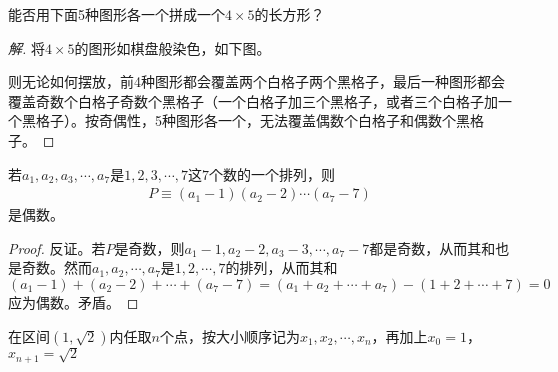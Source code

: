 \begin{example}
  能否用下面5种图形各一个拼成一个$4\times5$的长方形？

  \centering
\end{example}
\begin{proof}[解]
  将$4\times5$的图形如棋盘般染色，如下图。
  \begin{center}
  \end{center}
  则无论如何摆放，前4种图形都会覆盖两个白格子两个黑格子，最后一种图形都会覆盖奇数个白格子奇数个黑格子（一个白格子加三个黑格子，或者三个白格子加一个黑格子）。按奇偶性，5种图形各一个，无法覆盖偶数个白格子和偶数个黑格子。
\end{proof}

\begin{example}
  若$a_1,a_2,a_3,\cdots,a_7$是$1,2,3,\cdots,7$这$7$个数的一个排列，则
  \begin{align*}
    P\equiv (a_1 - 1)(a_2-2)\cdots(a_7-7)
  \end{align*}
  是偶数。
\end{example}
\begin{proof}
  反证。若$P$是奇数，则$a_1-1, a_2-2, a_3-3,\cdots, a_7-7$都是奇数，从而其和也是奇数。然而$a_1,a_2,\cdots,a_7$是$1,2,\cdots,7$的排列，从而其和$(a_1-1) + (a_2-2) + \cdots + (a_7-7)=(a_1+a_2+\cdots + a_7)-(1+2+\cdots+7)=0$应为偶数。矛盾。
\end{proof}

\begin{example}
  在区间$(1,\sqrt2)$内任取$n$个点，按大小顺序记为$x_1,x_2,\cdots,x_n$，再加上$x_0=1$，$x_{n+1}=\sqrt2$
\end{example}

